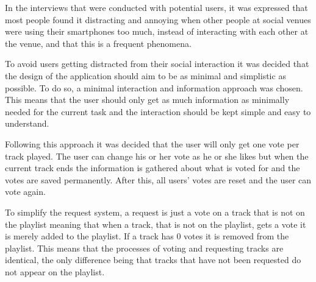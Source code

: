 In the interviews that were conducted with potential users, it was expressed that most people found it distracting and annoying when other people at social venues were using their smartphones too much, instead of interacting with each other at the venue, and that this is a frequent phenomena.

To avoid users getting distracted from their social interaction it was decided that the design of the application should aim to be as minimal and simplistic as possible. To do so, a minimal interaction and information approach was chosen. This means that the user should only get as much information as minimally needed for the current task and the interaction should be kept simple and easy to understand.

Following this approach it was decided that the user will only get one vote per track played. The user can change his or her vote as he or she likes but when the current track ends the information is gathered about what is voted for and the votes are saved permanently. After this, all users' votes are reset and the user can vote again.

To simplify the request system, a request is just a vote on a track that is not on the playlist meaning that when a track, that is not on the playlist, gets a vote it is merely added to the playlist. If a track has 0 votes it is removed from the playlist. This means that the processes of voting and requesting tracks are identical, the only difference being that tracks that have not been requested do not appear on the playlist.